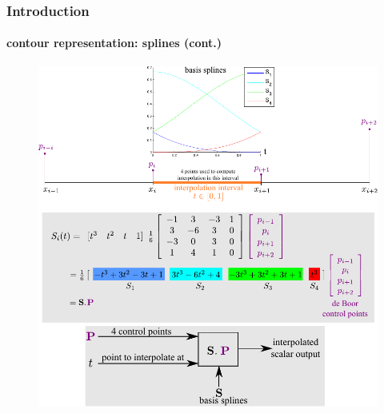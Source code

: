 \begin{frame}[plain]
\frametitle{Introduction}
\framesubtitle{contour representation: splines (cont.)}
\mypagenum
	\begin{changemargin}{-1.3in}{0in} 
		\begin{figure}
			\includegraphics[height=0.85\textheight]{figs/theory_curves_UniformCubicBsplines.pdf}
		\end{figure}
	\end{changemargin}
\end{frame}

